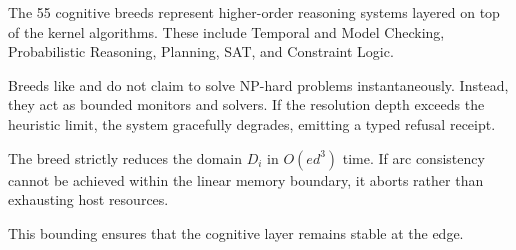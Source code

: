The 55 cognitive breeds represent higher-order reasoning systems layered on top of the kernel algorithms. These include Temporal and Model Checking, Probabilistic Reasoning, Planning, SAT, and Constraint Logic.

Breeds like  and  do not claim to solve NP-hard problems instantaneously. Instead, they act as bounded monitors and solvers. If the resolution depth exceeds the heuristic limit, the system gracefully degrades, emitting a typed refusal receipt.

\begin{proposition}
The  breed strictly reduces the domain $D_i$ in $O(ed^3)$ time. If arc consistency cannot be achieved within the linear memory boundary, it aborts rather than exhausting host resources.
\end{proposition}
This bounding ensures that the cognitive layer remains stable at the edge.
